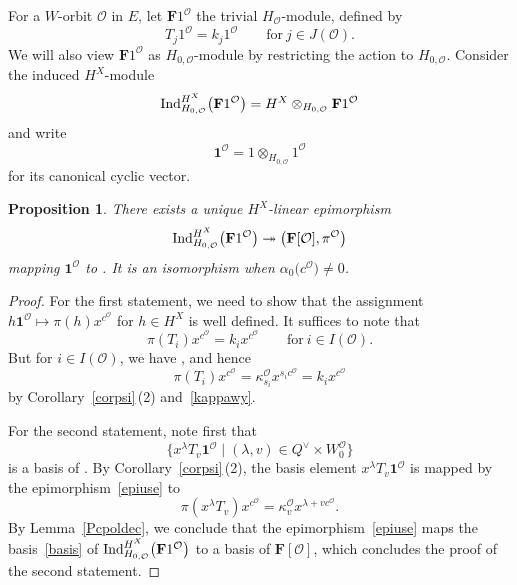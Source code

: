 \documentclass[pdftex]{sigma}
\numberwithin{equation}{section}
\newtheorem{Proposition}[Theorem]{Proposition}
\begin{document}
For a $W$-orbit $\mathcal{O}$ in $E$, let $\mathbf{F}1^\mathcal{O}$
the trivial $H_\mathcal{O}$-module, defined by
\[
T_j1^\mathcal{O}=k_j1^\mathcal{O}\qquad \text{for}\ j\in J(\mathcal{O}).
\]
We will also view $\mathbf{F}1^\mathcal{O}$ as $H_{0,\mathcal{O}}$-module by restricting the action to $H_{0,\mathcal{O}}$.
Consider the induced $H^X$-module
\[
{\rm Ind}_{H_{0,\mathcal{O}}}^{H^X}\bigl(\mathbf{F}1^{\mathcal{O}}\bigr)=H^X\otimes_{H_{0,\mathcal{O}}}\mathbf{F}1^\mathcal{O}
\]
and write
\[
\mathbf{1}^{\mathcal{O}}=1\otimes_{H_{0,\mathcal{O}}}1^\mathcal{O}
\]
for its canonical cyclic vector.

\begin{Proposition}\label{indcor}
There exists a unique $H^X$-linear epimorphism
\begin{equation}\label{epiuse}
{\rm Ind}_{H_{0,\mathcal{O}}}^{H^X}\bigl(\mathbf{F}1^{\mathcal{O}}\bigr)\twoheadrightarrow
\bigl(\mathbf{F}[\mathcal{O}],\pi^\mathcal{O}\bigr)
\end{equation}
mapping $\mathbf{1}^{\mathcal{O}}$ to . It is an isomorphism when $\alpha_0\bigl(c^\mathcal{O}\bigr)\not=0$.
\end{Proposition}

\begin{proof}
For the first statement, we need to show that the assignment $h\mathbf{1}^{\mathcal{O}}\mapsto\pi(h)x^{c^\mathcal{O}}$ for $h\in H^X$ is well defined. It suffices to note that
\[
\pi(T_i)x^{c^\mathcal{O}}=k_ix^{c^\mathcal{O}}\qquad \text{for}\ i\in I(\mathcal{O}).
\]
But for $i\in I(\mathcal{O})$, we have , and hence
\[
\pi(T_i)x^{c^\mathcal{O}}=\kappa_{s_i}^\mathcal{O} x^{s_ic^\mathcal{O}}=k_ix^{c^\mathcal{O}}
\]
by Corollary~\ref{corpsi}\,(2) and~\eqref{kappawy}.

For the second statement, note first that
\begin{equation}\label{basis}
\bigl\{x^\lambda T_v\mathbf{1}^{\mathcal{O}}\mid (\lambda,v)\in Q^\vee\times W_0^\mathcal{O}\bigr\}
\end{equation}
is a basis of . By Corollary~\ref{corpsi}\,(2), the basis element $x^\lambda T_v\mathbf{1}^{\mathcal{O}}$
is mapped by the epimorphism~\eqref{epiuse} to
\[
\pi(x^\lambda T_v)x^{c^\mathcal{O}}=\kappa_v^\mathcal{O}x^{\lambda+vc^\mathcal{O}}.
\]
By Lemma~\ref{Pcpoldec}, we conclude that the epimorphism~\eqref{epiuse} maps the basis~\eqref{basis} of
${\rm Ind}_{H_{0,\mathcal{O}}}^{H^X}\bigl(\mathbf{F}1^\mathcal{O}\bigr)$
to a basis of $\mathbf{F}[\mathcal{O}]$, which concludes the proof of the second statement.
\end{proof}
\end{document}

